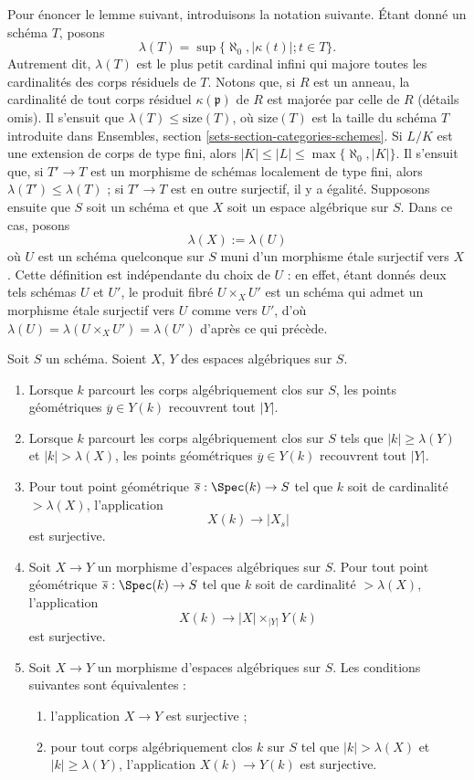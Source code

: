 \noindent
Pour énoncer le lemme suivant, introduisons la
notation suivante. Étant donné un schéma $T$, posons
$$
\lambda(T) = \sup\{\aleph_0, |\kappa(t)| ; t \in T\}.
$$
Autrement dit, $\lambda(T)$ est le plus petit cardinal infini qui majore
toutes les cardinalités des corps résiduels de $T$. Notons que, si $R$
est un anneau, la cardinalité de tout corps résiduel $\kappa(\mathfrak p)$
de $R$ est majorée par celle de $R$ (détails omis).
Il s'ensuit que $\lambda(T) \leq \text{size}(T)$, où
$\text{size}(T)$ est la taille du schéma $T$ introduite dans
Ensembles, section \ref{sets-section-categories-schemes}.
Si $L/K$ est une extension de corps de type fini, alors
$|K| \leq |L| \leq \max\{\aleph_0, |K|\}$. Il s'ensuit que, si $T' \to T$
est un morphisme de schémas localement de type
fini, alors $\lambda(T') \leq \lambda(T)$ ; si $T' \to T$ est en outre
surjectif, il y a égalité. Supposons ensuite que $S$ soit un schéma
et que $X$ soit un espace algébrique sur $S$. Dans ce cas, posons
$$
\lambda(X) := \lambda(U)
$$
où $U$ est un schéma quelconque sur $S$ muni d'un morphisme étale surjectif
vers $X$. Cette définition est indépendante du choix de $U$ :
en effet, étant donnés deux tels schémas $U$ et $U'$, le produit fibré
$U \times_X U'$ est un schéma qui admet un morphisme étale surjectif
vers $U$ comme vers $U'$, d'où $\lambda(U) = \lambda(U \times_X U') =
\lambda(U')$ d'après ce qui précède.

\begin{lemma}
\label{lemma-large-enough}
Soit $S$ un schéma. Soient $X$, $Y$ des espaces algébriques sur $S$.
\begin{enumerate}
\item Lorsque $k$ parcourt les corps algébriquement clos sur $S$,
les points géométriques $\overline{y} \in Y(k)$ recouvrent tout $|Y|$.
\item Lorsque $k$ parcourt les corps algébriquement clos sur $S$ tels que
$|k| \geq \lambda(Y)$ et $|k| > \lambda(X)$, les points géométriques
$\overline{y} \in Y(k)$ recouvrent tout $|Y|$.
\item Pour tout point géométrique
$\overline{s} : \Spec(k) \to S$ tel que
$k$ soit de cardinalité $> \lambda(X)$, l'application
$$
X(k) \longrightarrow |X_s|
$$
est surjective.
\item Soit $X \to Y$ un morphisme d'espaces algébriques sur $S$.
Pour tout point géométrique $\overline{s} : \Spec(k) \to S$ tel que
$k$ soit de cardinalité $> \lambda(X)$, l'application
$$
X(k) \longrightarrow |X| \times_{|Y|} Y(k)
$$
est surjective.
\item Soit $X \to Y$ un morphisme d'espaces algébriques sur $S$.
Les conditions suivantes sont équivalentes :
\begin{enumerate}
\item l'application $X \to Y$ est surjective ;
\item pour tout corps algébriquement clos $k$ sur $S$ tel que
$|k| > \lambda(X)$ et $|k| \geq \lambda(Y)$, l'application $X(k) \to Y(k)$
est surjective.
\end{enumerate}
\end{enumerate}
\end{lemma}

